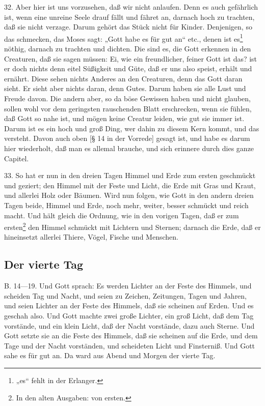 32. Aber hier ist uns vorzusehen, daß wir nicht anlaufen. Denn es auch gefährlich ist, wenn eine unreine Seele drauf fällt und fähret an, darnach hoch zu trachten, daß sie nicht verzage. Darum gehört das Stück nicht für Kinder. Denjenigen, so das schmecken, das Moses sagt: „Gott habe es für gut an“ etc., denen ist es\footnote{„es“ fehlt in der Erlanger.} nöthig, darnach zu trachten und dichten. Die sind es, die Gott erkennen in den Creaturen, daß sie sagen müssen: Ei, wie ein freundlicher, feiner Gott ist das? ist er doch nichts denn eitel Süßigkeit und Güte, daß er uns also speist, erhält und ernährt. Diese sehen nichts Anderes an den Creaturen, denn das Gott daran sieht. Er sieht aber nichts daran, denn Gutes. Darum haben sie alle Lust und Freude davon. Die andern aber, so da böse Gewissen haben und nicht glauben, sollen wohl vor dem geringsten rauschenden Blatt erschrecken, wenn sie fühlen, daß Gott so nahe ist, und mögen keine Creatur leiden, wie gut sie immer ist. Darum ist es ein hoch und groß Ding, wer dahin zu diesem Kern kommt, und das versteht. Davon auch oben [§ 14 in der Vorrede] gesagt ist, und habe es darum hier wiederholt, daß man es allemal brauche, und sich erinnere durch dies ganze Capitel.

33. So hat er nun in den dreien Tagen Himmel und Erde zum ersten geschmückt und geziert; den Himmel mit der Feste und Licht, die Erde mit Gras und Kraut, und allerlei Holz oder Bäumen. Wird nun folgen, wie Gott in den andern dreien Tagen beide, Himmel und Erde,
noch mehr, weiter, besser schmückt und reich macht. Und hält gleich die Ordnung, wie in den vorigen Tagen, daß er zum ersten\footnote{In den alten Ausgaben: von ersten.} den Himmel schmückt mit Lichtern und Sternen; darnach die Erde, daß er hineinsetzt allerlei Thiere, Vögel, Fische und Menschen.

\subsection{Der vierte Tag}

B. 14—19. Und Gott sprach: Es werden Lichter an der Feste des Himmels, und scheiden Tag und Nacht, und seien zu Zeichen, Zeitungen, Tagen und Jahren, und seien Lichter an der Feste des Himmels, daß sie scheinen auf Erden. Und es geschah also. Und Gott machte zwei große Lichter, ein groß Licht, daß dem Tag vorstände, und ein klein Licht, daß der Nacht vorstände, dazu auch Sterne. Und Gott setzte sie an die Feste des Himmels, daß sie scheinen auf die Erde, und dem Tage und der Nacht vorständen, und scheideten Licht und Finsterniß. Und Gott sahe es für gut an. Da ward aus Abend und Morgen der vierte Tag.

